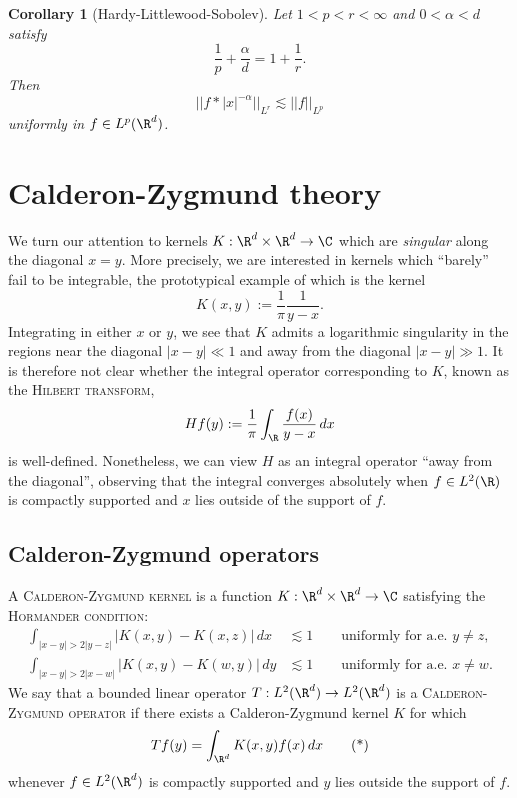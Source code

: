 \documentclass[reqno]{amsart}
\newtheorem{corollary}[theorem]{Corollary}
\theoremstyle{definition}
\theoremstyle{remark}
\renewcommand{\emph}{\textsc}
\begin{document}
\begin{corollary}[Hardy-Littlewood-Sobolev]
	Let $1 < p < r < \infty$ and $0 < \alpha < d$ satisfy 
		\[ \frac1p + \frac{\alpha}{d} = 1 + \frac1r.\]
	Then 
		\[ || f * |x|^{-\alpha} ||_{L^r} \lesssim ||f||_{L^p} \]
	uniformly in $f \in L^p (\R^d)$. 		
\end{corollary}

\section{Calderon-Zygmund theory}

We turn our attention to kernels $K : \R^d \times \R^d \to \C$ which are \textit{singular} along the diagonal $x = y$. More precisely, we are interested in kernels which ``barely'' fail to be integrable, the prototypical example of which is the kernel
	\[ K(x, y) := \frac1\pi \frac{1}{y - x}. \]
Integrating in either $x$ or $y$, we see that $K$ admits a logarithmic singularity in the regions near the diagonal $|x - y| \ll 1$ and away from the diagonal $|x - y| \gg 1$. It is therefore not clear whether the integral operator corresponding to $K$, known as the \emph{Hilbert transform},
	\[ H f(y) := \frac1\pi \int_\R \frac{f(x)}{y - x} \, dx \]
is well-defined. Nonetheless, we can view $H$ as an integral operator ``away from the diagonal'', observing that the integral converges absolutely when $f \in L^2 (\R)$ is compactly supported and $x$ lies outside of the support of $f$. 

\subsection{Calderon-Zygmund operators}

A \emph{Calderon-Zygmund kernel} is a function $K : \R^d \times \R^d \to \C$ satisfying the \emph{Hormander condition}:
	\begin{align*}
		\int_{|x - y| > 2|y - z|} |K(x, y) - K(x, z)| \, dx &\lesssim 1 \qquad \text{uniformly for a.e. $y \neq z$}, \\
		\int_{|x - y| > 2|x - w|} |K(x, y) - K(w, y)| \, dy &\lesssim 1 \qquad \text{uniformly for a.e. $x \neq w$}.
	\end{align*}
We say that a bounded linear operator $T: L^2 (\R^d) \to L^2 (\R^d)$ is a \emph{Calderon-Zygmund operator} if there exists a Calderon-Zygmund kernel $K$ for which 
	\begin{equation}
		Tf(y) = \int_{\R^d} K(x, y) f(x) \, dx \tag{*} \label{eq:intCZO}
	\end{equation}
whenever $f \in L^2 (\R^d)$ is compactly supported and $y$ lies outside the support of $f$. 
\end{document}
